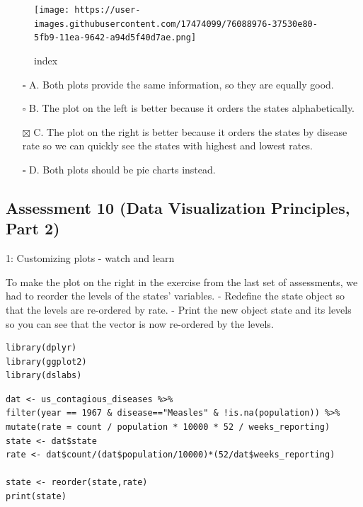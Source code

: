 \documentclass[
]{article}
\providecommand{\tightlist}{%
  \setlength{\itemsep}{0pt}\setlength{\parskip}{0pt}}
\begin{document}
\begin{figure}
\centering
\texttt{[image: https://user-images.githubusercontent.com/17474099/76088976-37530e80-5fb9-11ea-9642-a94d5f40d7ae.png]}
\caption{index}
\end{figure}

\begin{itemize}
\tightlist
\item[$\square$]
  A. Both plots provide the same information, so they are equally good.
\item[$\square$]
  B. The plot on the left is better because it orders the states
  alphabetically.
\item[$\boxtimes$]
  C. The plot on the right is better because it orders the states by
  disease rate so we can quickly see the states with highest and lowest
  rates.
\item[$\square$]
  D. Both plots should be pie charts instead.
\end{itemize}

\hypertarget{assessment-10-data-visualization-principles-part-2}{%
\subsection{Assessment 10 (Data Visualization Principles, Part
2)}\label{assessment-10-data-visualization-principles-part-2}}

1: Customizing plots - watch and learn

To make the plot on the right in the exercise from the last set of
assessments, we had to reorder the levels of the states' variables. -
Redefine the state object so that the levels are re-ordered by rate. -
Print the new object state and its levels so you can see that the vector
is now re-ordered by the levels.

\begin{verbatim}
library(dplyr)
library(ggplot2)
library(dslabs)
\end{verbatim}

\begin{verbatim}
dat <- us_contagious_diseases %>%
filter(year == 1967 & disease=="Measles" & !is.na(population)) %>% mutate(rate = count / population * 10000 * 52 / weeks_reporting)
state <- dat$state 
rate <- dat$count/(dat$population/10000)*(52/dat$weeks_reporting)

state <- reorder(state,rate)
print(state)
\end{verbatim}
\end{document}

